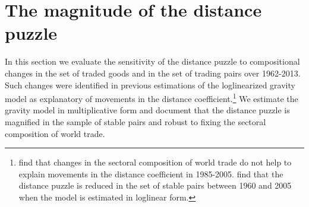 \documentclass[12pt,twoside,a4paper,notitlepage]{article}
\begin{document}
\section{The magnitude of the distance puzzle} \label{sec:part1} 
In this section we evaluate the sensitivity of the distance puzzle to compositional changes in the set of traded goods and in the set of trading pairs over 1962-2013.
Such changes were identified in previous estimations of the loglinearized gravity model as explanatory of movements in the distance coefficient.\footnote{\cite{Berthelon2008} find that changes in the sectoral composition of world trade do not help to explain movements in the distance coefficient in 1985-2005.
\cite{Head2013} find that the distance puzzle is reduced in the set of stable pairs between 1960 and 2005 when the model is estimated in loglinear form.}
We estimate the gravity model in multiplicative form and document that the distance puzzle is magnified in the sample of stable pairs and robust to fixing the sectoral composition of world trade.


 
\end{document}
